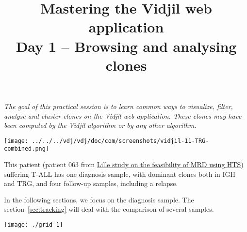 \documentclass[11pt]{article}
\title{Mastering the Vidjil web application \\[1ex] Day 1 -- Browsing and analysing clones
}
\begin{document}
\maketitle

\textit{The goal of this practical session is to learn
common ways to visualize, filter, analyse and cluster clones
on the Vidjil web application.
%
These clones may have been computed by the Vidjil algorithm
or by any other algorithm.}

\bigskip


\centerline{\texttt{[image: ../../../vdj/vdj/doc/com/screenshots/vidjil-11-TRG-combined.png]}}

\bigskip



This patient (patient 063 from \href{http://dx.doi.org/10.1016/j.leukres.2016.11com.009}{Lille study on the feasibility of MRD using HTS}) suffering T-ALL has one diagnosis sample,
with dominant clones both in IGH and TRG,
and four follow-up samples, including a relapse.


In the following sections, we focus on the diagnosis sample.
The section~\ref{sec:tracking} will deal with the comparison of several samples. 







\bigskip

\bigskip

\centerline{\texttt{[image: ./grid-1]}}
\end{document}

